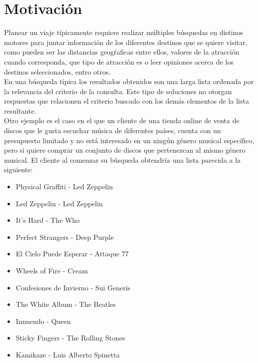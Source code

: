 \section{Motivación}
Planear un viaje típicamente requiere realizar múltiples búsquedas en distinos motores para juntar información de los diferentes destinos que se quiere visitar, como pueden ser las distancias geogŕaficas entre ellos, valores de la atracción cuando corresponda, que tipo de atracción es o leer opiniones acerca de los destinos seleccionados, entro otros.\\
En una búsqueda típica los resultados obtenidos son una larga lista ordenada por la relevancia del criterio de la consulta. Este tipo de soluciones no otorgan respuestas que relacionen el criterio buscado con los demás elementos de la lista resultante.\\
Otro ejemplo es el caso en el que un cliente de una tienda online de venta de discos que le gusta escuchar música de diferentes países, cuenta con un presupuesto limitado y no está interesado en un ningún género musical específico, pero si quiere comprar un conjunto de discos que pertenezcan al mismo género musical. El cliente al comenzar su búsqueda obtendría una lista parecida a la siguiente:
\begin{itemize}
  \item Physical Graffiti - Led Zeppelin
  \item Led Zeppelin - Led Zeppelin
  \item It's Hard - The Who
  \item Perfect Strangers - Deep Purple
  \item El Cielo Puede Esperar - Attaque 77
  \item Wheels of Fire - Cream
  \item Confesiones de Invierno - Sui Generis
  \item The White Album - The Beatles
  \item Innuendo - Queen
  \item Sticky Fingers - The Rolling Stones
  \item Kamikaze - Luis Alberto Spinetta
\end{itemize}

